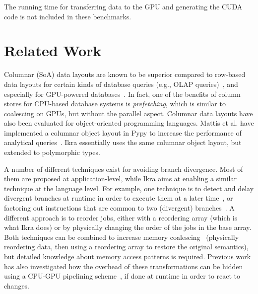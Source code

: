 \documentclass[preprint]{sigplanconf}
\begin{document}
The running time for transferring data to the GPU and generating the CUDA code is not included in these benchmarks.

\section{Related Work}
Columnar (SoA) data layouts are known to be superior compared to row-based data layouts for certain kinds of database queries (e.g., OLAP queries)~\cite{Plattner:2009:CDA:1559845.1559846}, and especially for GPU-powered databases~\cite{Bakkum:2010:ASD:1735688.1735706}. In fact, one of the benefits of column stores for CPU-based database systems is \emph{prefetching}, which is similar to coalescing on GPUs, but without the parallel aspect. Columnar data layouts have also been evaluated for object-oriented programming languages. Mattis et al. have implemented a columnar object layout in Pypy to increase the performance of analytical queries~\cite{Mattis:2015:COI:2814228.2814230}. Ikra essentially uses the same columnar object layout, but extended to polymorphic types.

A number of different techniques exist for avoiding branch divergence. Most of them are proposed at application-level, while Ikra aims at enabling a similar technique at the language level. For example, one technique is to detect and delay divergent branches at runtime in order to execute them at a later time~\cite{88d22b7f17}, or factoring out instructions that are common to two (divergent) branches~\cite{Han:2011:RBD:1964179.1964184}. A different approach is to reorder jobs, either with a reordering array (which is what Ikra does) or by physically changing the order of the jobs in the base array. Both techniques can be combined to increase memory coalescing~\cite{Zhang:2011:OED:1950365.1950408} (physically reordering data, then using a reordering array to restore the original semantics), but detailed knowledge about memory access patterns is required. Previous work has also investigated how the overhead of these transformations can be hidden using a CPU-GPU pipelining scheme~\cite{Zhang:2010:SGA:1810085.1810104}, if done at runtime in order to react to changes.
\end{document}
